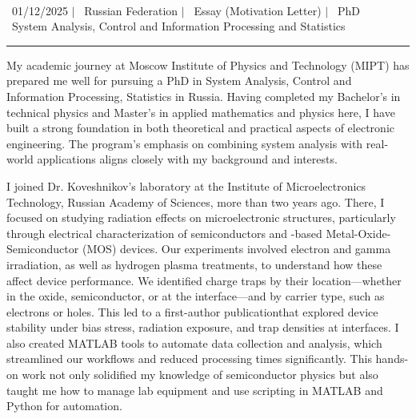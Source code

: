 \documentclass[a4paper,12pt]{article}
\begin{document}
\begin{center}
    {\Huge \scshape {\fontsize{25}{30}\selectfont{Reza}} {\fontsize{25}{30}}} \\ \vspace{3pt}
    {\small \raisebox{-0.2\height}\ {01/12/2025}} $|$
    {\small \raisebox{-0.2\height}\ {Russian Federation}} $|$
    {\small \raisebox{-0.2\height}\ {Essay (Motivation Letter)}} $|$
    {\small \raisebox{-0.2\height}\ {PhD}}
    \\
    {\small \raisebox{-0.2\height}\ {System Analysis, Control and Information Processing and Statistics}} 
    \vspace{-10pt}
\end{center}
\vspace{-10pt}

\noindent\rule{\textwidth}{1pt}

My academic journey at Moscow Institute of Physics and Technology (MIPT) has prepared me well for pursuing a PhD in System Analysis, Control and Information Processing, Statistics in Russia. Having completed my Bachelor's in technical physics and Master's in applied mathematics and physics here, I have built a strong foundation in both theoretical and practical aspects of electronic engineering. The program's emphasis on combining system analysis with real-world applications aligns closely with my background and interests.

\vspace{10pt}

I joined Dr. Koveshnikov's laboratory at the Institute of Microelectronics Technology, Russian Academy of Sciences, more than two years ago. There, I focused on studying radiation effects on microelectronic structures, particularly through electrical characterization of semiconductors and -based Metal-Oxide-Semiconductor (MOS) devices. Our experiments involved electron and gamma irradiation, as well as hydrogen plasma treatments, to understand how these affect device performance. We identified charge traps by their location—whether in the oxide, semiconductor, or at the interface—and by carrier type, such as electrons or holes. This led to a first-author publication\footnotemark[1] that explored device stability under bias stress, radiation exposure, and trap densities at interfaces. I also created MATLAB tools to automate data collection and analysis, which streamlined our workflows and reduced processing times significantly. This hands-on work not only solidified my knowledge of semiconductor physics but also taught me how to manage lab equipment and use scripting in MATLAB and Python for automation.
\end{document}
